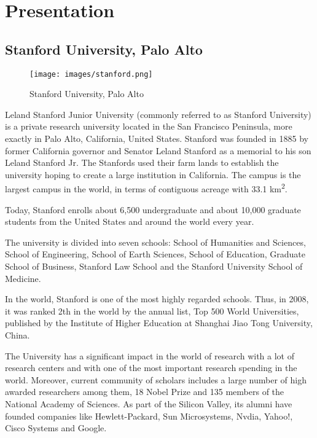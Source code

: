 \chapter{Presentation}
\section{Stanford University, Palo Alto}

\begin{figure}[!h]
\begin{center}
\texttt{[image: images/stanford.png]}
\caption{\small Stanford University, Palo Alto}
\end{center}
\end{figure}
\par
Leland Stanford Junior University (commonly referred to as Stanford University) is a private research university located in the San Francisco Peninsula, more exactly in Palo Alto, California, United States. Stanford was founded in 1885 by former California governor and Senator Leland Stanford as a memorial to his son Leland Stanford Jr. The Stanfords used their farm lands to establish the university hoping to create a large institution in California. The campus is the largest campus in the world, in terms of contiguous acreage with 33.1 km\textsuperscript{2}.
\par
Today, Stanford enrolls about 6,500 undergraduate and about 10,000 graduate students from the United States and around the world every year.
\par
The university is divided into seven schools: School of Humanities and Sciences, School of Engineering, School of Earth Sciences, School of Education, Graduate School of Business, Stanford Law School and the Stanford University School of Medicine.
\par 
In the world, Stanford is one of the most highly regarded schools. Thus, in 2008, it was ranked 2th in the world by the annual list, Top 500 World Universities, published by the Institute of Higher Education at Shanghai Jiao Tong University, China.
\par
The University has a significant impact in the world of research with a lot of research centers and with one of the most important research spending in the world. Moreover, current community of scholars includes a large number of high awarded researchers among them, 18 Nobel Prize and 135 members of the National Academy of Sciences. As part of the Silicon Valley, its alumni have founded companies like Hewlett-Packard, Sun Microsystems, Nvdia, Yahoo!, Cisco Systems and Google.

